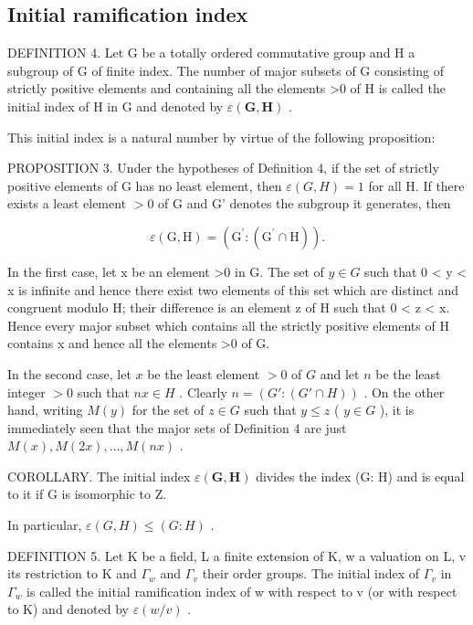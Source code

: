 \subsection{Initial ramification index}

DEFINITION 4. Let G be a totally ordered commutative group and H a subgroup of G of finite index. The number of major subsets of G consisting of strictly positive elements and containing all the elements \textgreater0 of H is called the initial index of H in G and denoted by \(\varepsilon(\mathbf{G}, \mathbf{H})\) .

This initial index is a natural number by virtue of the following proposition:

PROPOSITION 3. Under the hypotheses of Definition 4, if the set of strictly positive elements of G has no least element, then \(\varepsilon(G, H) = 1\) for all H. If there exists a least element \(>0\) of G and G' denotes the subgroup it generates, then

\[
\varepsilon (\mathrm{G}, \mathrm{H}) = (\mathrm{G} ^ {\prime}: (\mathrm{G} ^ {\prime} \cap \mathrm{H})).
\]

In the first case, let x be an element \textgreater0 in G. The set of \(y \in G\) such that 0 \textless{} y \textless{} x is infinite and hence there exist two elements of this set which are distinct and congruent modulo H; their difference is an element z of H such that 0 \textless{} z \textless{} x. Hence every major subset which contains all the strictly positive elements of H contains x and hence all the elements \textgreater0 of G.

In the second case, let \(x\) be the least element \(>0\) of \(G\) and let \(n\) be the least integer \(>0\) such that \(nx \in H\) . Clearly \(n = (G': (G' \cap H))\) . On the other hand, writing \(M(y)\) for the set of \(z \in G\) such that \(y \leqslant z\) ( \(y \in G\) ), it is immediately seen that the major sets of Definition 4 are just \(M(x), M(2x), \ldots, M(nx)\) .

COROLLARY. The initial index \(\varepsilon(\mathbf{G},\mathbf{H})\) divides the index (G: H) and is equal to it if G is isomorphic to Z.

In particular, \(\varepsilon(G, H) \leqslant (G: H)\) .

DEFINITION 5. Let K be a field, L a finite extension of K, w a valuation on L, v its restriction to K and \(\Gamma_{w}\) and \(\Gamma_{v}\) their order groups. The initial index of \(\Gamma_{v}\) in \(\Gamma_{w}\) is called the initial ramification index of w with respect to v (or with respect to K) and denoted by \(\varepsilon(w/v)\) .

